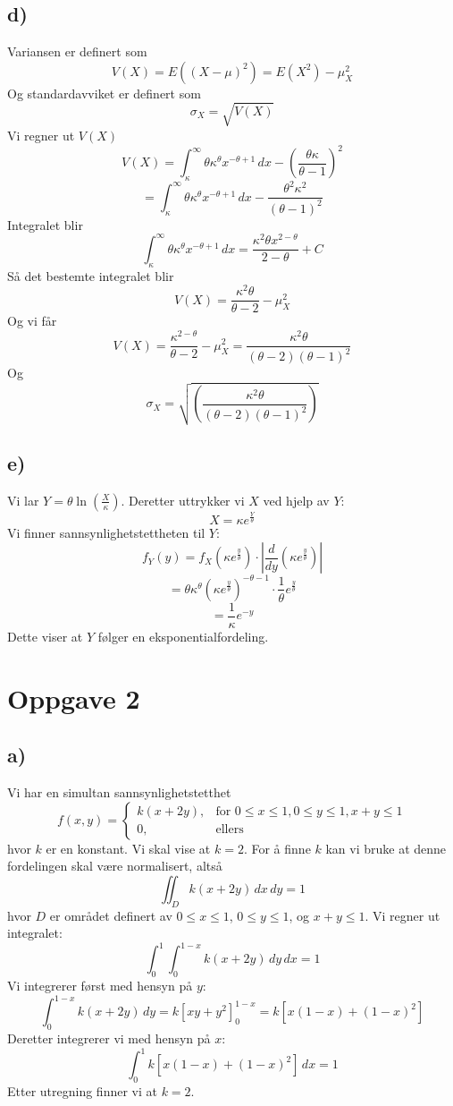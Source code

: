 \documentclass[a4paper, 12pt]{article}
\begin{document}
\subsection*{d)}
Variansen er definert som
\[
V(X) = E((X - \mu)^2) = E(X^2) - \mu_X^2
\]
Og standardavviket er definert som
\[
\sigma_X = \sqrt{V(X)}
\]
Vi regner ut \( V(X) \)
\[
V(X) = \int_{\kappa}^{\infty} \theta \kappa^{\theta} x^{-\theta+1} \, dx - (\frac{\theta \kappa}{\theta - 1})^{2}
\]
\[
= \int_{\kappa}^{\infty} \theta \kappa^{\theta} x^{-\theta+1} \, dx - \frac{\theta^{2} \kappa^{2}}{(\theta - 1)^{2}}
\]
Integralet blir
\[
\int_{\kappa}^{\infty} \theta \kappa^{\theta} x^{-\theta+1} \, dx = \frac{\kappa^{2}\theta x^{2-\theta}}{2-\theta} + C
\]
Så det bestemte integralet blir
\[
V(X) = \frac{\kappa^{2}\theta}{\theta - 2} - \mu_X^2
\]
Og vi får
\[
V(X) = \frac{\kappa^{2-\theta}}{\theta - 2} - \mu_X^2 = \frac{\kappa^{2}\theta}{(\theta - 2)(\theta - 1)^{2}}
\]
Og
\[
\sigma_X = \sqrt{(\frac{\kappa^{2}\theta}{(\theta - 2)(\theta - 1)^{2}})}
\]

\subsection*{e)}
Vi lar \( Y = \theta \ln\left(\frac{X}{\kappa}\right) \). Deretter uttrykker vi \( X \) ved hjelp av \( Y \):
\[
X = \kappa e^{\frac{Y}{\theta}}
\]
Vi finner sannsynlighetstettheten til \( Y \):
\[
f_Y(y) = f_X\left(\kappa e^{\frac{y}{\theta}}\right) \cdot \left|\frac{d}{dy}\left(\kappa e^{\frac{y}{\theta}}\right)\right|
\]
\[
= \theta \kappa^\theta \left(\kappa e^{\frac{y}{\theta}}\right)^{-\theta-1} \cdot \frac{1}{\theta} e^{\frac{y}{\theta}}
\]
\[
= \frac{1}{\kappa} e^{-y}
\]
Dette viser at \( Y \) følger en eksponentialfordeling.

\section*{Oppgave 2}
\subsection*{a)}
Vi har en simultan sannsynlighetstetthet
\[
f(x, y) = 
\begin{cases} 
k(x + 2y), & \text{for } 0 \leq x \leq 1, 0 \leq y \leq 1, x + y \leq 1 \\
0, & \text{ellers}
\end{cases}
\]
hvor \( k \) er en konstant. Vi skal vise at \( k = 2 \). For å finne \( k \) kan vi bruke at denne fordelingen skal være normalisert, altså
\[
\iint_D k(x + 2y) \, dx \, dy = 1
\]
hvor \( D \) er området definert av \( 0 \leq x \leq 1 \), \( 0 \leq y \leq 1 \), og \( x + y \leq 1 \). Vi regner ut integralet:
\[
\int_0^1 \int_0^{1-x} k(x + 2y) \, dy \, dx = 1
\]
Vi integrerer først med hensyn på \( y \):
\[
\int_0^{1-x} k(x + 2y) \, dy = k \left[xy + y^2\right]_{0}^{1-x} = k\left[x(1-x) + (1-x)^2\right]
\]
Deretter integrerer vi med hensyn på \( x \):
\[
\int_0^1 k\left[x(1-x) + (1-x)^2\right] \, dx = 1
\]
Etter utregning finner vi at \( k = 2 \).
\end{document}

